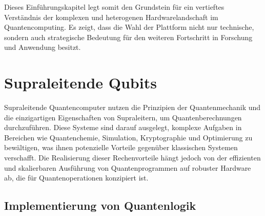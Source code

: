 Dieses Einführungskapitel legt somit den Grundstein für ein vertieftes Verständnis der komplexen und heterogenen Hardwarelandschaft im Quantencomputing. Es zeigt, dass die Wahl der Plattform nicht nur technische, sondern auch strategische Bedeutung für den weiteren Fortschritt in Forschung und Anwendung besitzt.

\section{Supraleitende Qubits}
Supraleitende Quantencomputer nutzen die Prinzipien der Quantenmechanik und die einzigartigen Eigenschaften von Supraleitern, um Quantenberechnungen durchzuführen. Diese Systeme sind darauf ausgelegt, komplexe Aufgaben in Bereichen wie Quantenchemie, Simulation, Kryptographie und Optimierung zu bewältigen, was ihnen potenzielle Vorteile gegenüber klassischen Systemen verschafft. Die Realisierung dieser Rechenvorteile hängt jedoch von der effizienten und skalierbaren Ausführung von Quantenprogrammen auf robuster Hardware ab, die für Quantenoperationen konzipiert ist.
\subsection{Implementierung von Quantenlogik}
